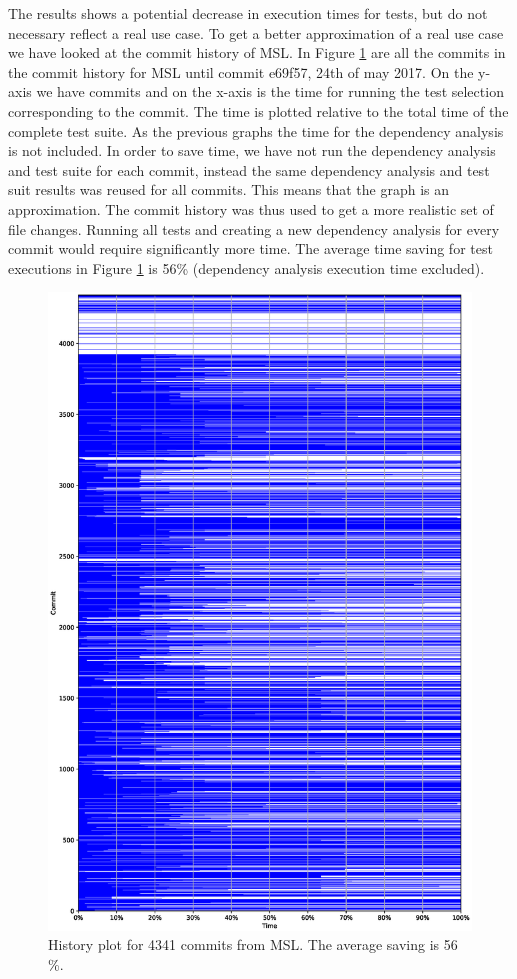 \documentclass{cslthse-msc}
\begin{document}
The results shows a potential decrease in execution times for tests, but do not necessary reflect a real use case. To get a better approximation of a real use case we have looked at the commit history of MSL. In Figure \ref{fig:mslhistory} are all the commits in the commit history for MSL until commit e69f57, 24th of may 2017. On the y-axis we have commits and on the x-axis is the time for running the test selection corresponding to the commit. The time is plotted relative to the total time of the complete test suite. As the previous graphs the time for the dependency analysis is not included. In order to save time, we have not run the dependency analysis and test suite for each commit, instead the same dependency analysis and test suit results was reused for all commits. This means that the graph is an approximation. The commit history was thus used to get a more realistic set of file changes. Running all tests and creating a new dependency analysis for every commit would require significantly more time. The average time saving for test executions in Figure \ref{fig:mslhistory} is 56\% (dependency analysis execution time excluded).

\begin{figure}[!htbp]
    \centering
    \includegraphics[width=\textwidth]{Graphs/MSL_history_plot.eps}
    \caption{History plot for 4341 commits from MSL. The average saving is 56 \%.}
    \label{fig:mslhistory}
\end{figure}
\end{document}
